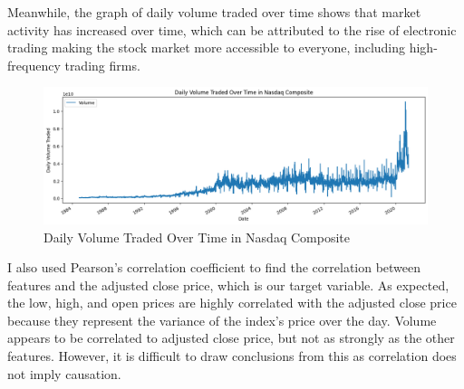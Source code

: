 \documentclass[a4paper, 11pt]{article}
\begin{document}
Meanwhile, the graph of daily volume traded over time shows that market activity has increased over time, which can be attributed to the rise of electronic trading making the stock market more accessible to everyone, including high-frequency trading firms.

\begin{figure}
    \begin{center}
        \includegraphics[width=1\textwidth]{Daily Volume Traded Over Time in Nasdaq Composite.png}
        \caption{Daily Volume Traded Over Time in Nasdaq Composite}
    \end{center}
\end{figure}

I also used Pearson's correlation coefficient to find the correlation between features and the adjusted close price, which is our target variable. As expected, the low, high, and open prices are highly correlated with the adjusted close price because they represent the variance of the index's price over the day. Volume appears to be correlated to adjusted close price, but not as strongly as the other features. However, it is difficult to draw conclusions from this as correlation does not imply causation.
\end{document}

